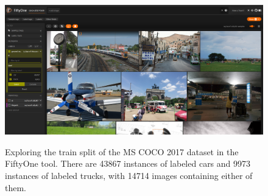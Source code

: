 \begin{figure}[h]
    \captionsetup{width=\textwidth}
    \caption{Exploring the train split of the MS COCO 2017 dataset in the FiftyOne tool. There are 43867 instances of labeled cars and 9973 instances of labeled trucks, with 14714 images containing either of them.}
    \includegraphics[width=\textwidth]{figures/fiftyone-coco-car-truck.png}\label{fig:fiftyone-car-truck}
\end{figure}

